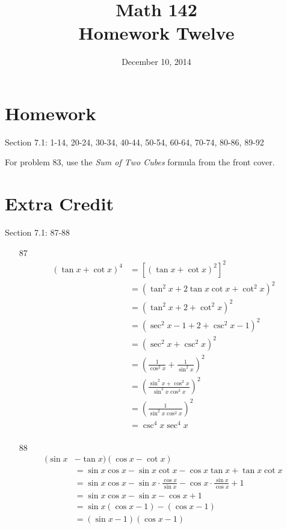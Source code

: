 \documentclass{exam}
\author{}
\date{December 10, 2014}
\title{Math 142 \\ Homework Twelve}
\begin{document}
  \maketitle

  \section{Homework}
  Section 7.1: 1-14, 20-24, 30-34, 40-44, 50-54, 60-64, 70-74, 80-86, 89-92

  For problem 83, use the {\em Sum of Two Cubes} formula from the front cover.

  \section{Extra Credit}
  Section 7.1: 87-88

  \ifprintanswers
    \pagebreak
    \begin{enumerate}

      \item[87] 
        \begin{align*}
          (\tan x + \cot x)^4 & = \left[ (\tan x + \cot x)^2 \right]^2 \\
                              & = \left( \tan^2 x + 2 \tan x \cot x + \cot^2 x \right)^2 \\
                              & = \left( \tan^2 x + 2 + \cot^2 x \right)^2 \\
                              & = \left( \sec^2 x - 1 + 2 + \csc^2 x - 1 \right)^2 \\
                              & = \left( \sec^2 x + \csc^2 x \right)^2 \\
                              & = \left( \frac{1}{\cos^2 x} + \frac{1}{\sin^2 x} \right)^2 \\
                              & = \left( \frac{\sin^2 x + \cos^2 x}{\sin^2 x \cos^2 x} \right)^2 \\
                              & = \left( \frac{1}{\sin^2 x \cos^2 x} \right)^2 \\
                              & = \csc^4 x \sec^4 x \\
        \end{align*}

      \item[88] 
        \begin{align*}
          (\sin x & - \tan x)(\cos x - \cot x) \\
                  & = \sin x \cos x - \sin x \cot x - \cos x \tan x + \tan x \cot x \\
                  & = \sin x \cos x - \sin x \cdot \frac{\cos x}{\sin x} - \cos x \cdot \frac{\sin x}{\cos x} + 1  \\
                  & = \sin x \cos x - \sin x - \cos x + 1  \\
                  & = \sin x(\cos x - 1) - (\cos x - 1) \\
                  & = (\sin x - 1)(\cos x - 1)
        \end{align*}

    \end{enumerate}
  \fi
\end{document}
